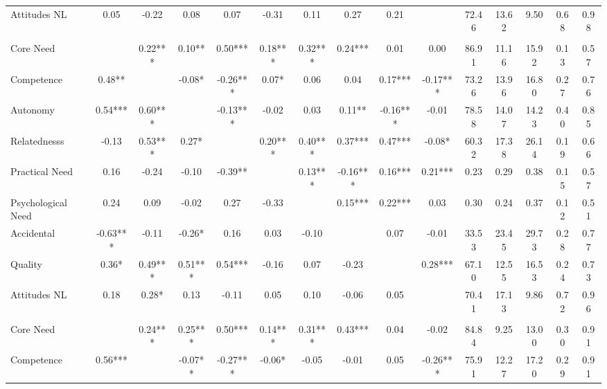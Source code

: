 \begin{table}
\begin{minipage}[t][\textheight][t]{\textwidth}
{\begin{tabular}[t]{lcccccccccccccc}
\hspace{1em}Attitudes NL & 0.05 & -0.22 & 0.08 & 0.07 & -0.31 & 0.11 & 0.27 & 0.21 &  & 72.46 & 13.62 & 9.50 & 0.68 & 0.98\\
\addlinespace[0.3em]
\multicolumn{15}{l}{\textbf{Study 2}}\\
\hspace{1em}Core Need &  & 0.22*** & 0.10** & 0.50*** & 0.18*** & 0.32*** & 0.24*** & 0.01 & 0.00 & 86.91 & 11.16 & 15.92 & 0.13 & 0.57\\
\hspace{1em}Competence & 0.48** &  & -0.08* & -0.26*** & 0.07* & 0.06 & 0.04 & 0.17*** & -0.17*** & 73.26 & 13.96 & 16.80 & 0.27 & 0.76\\
\hspace{1em}Autonomy & 0.54*** & 0.60*** &  & -0.13*** & -0.02 & 0.03 & 0.11** & -0.16*** & -0.01 & 78.58 & 14.07 & 14.23 & 0.40 & 0.85\\
\hspace{1em}Relatednesss & -0.13 & 0.53*** & 0.27* &  & 0.20*** & 0.40*** & 0.37*** & 0.47*** & -0.08* & 60.32 & 17.38 & 26.14 & 0.19 & 0.66\\
\hspace{1em}Practical Need & 0.16 & -0.24 & -0.10 & -0.39** &  & 0.13*** & -0.16*** & 0.16*** & 0.21*** & 0.23 & 0.29 & 0.38 & 0.15 & 0.57\\
\hspace{1em}Psychological Need & 0.24 & 0.09 & -0.02 & 0.27 & -0.33 &  & 0.15*** & 0.22*** & 0.03 & 0.30 & 0.24 & 0.37 & 0.12 & 0.51\\
\hspace{1em}Accidental & -0.63*** & -0.11 & -0.26* & 0.16 & 0.03 & -0.10 &  & 0.07 & -0.01 & 33.53 & 23.45 & 29.73 & 0.28 & 0.77\\
\hspace{1em}Quality & 0.36* & 0.49*** & 0.51*** & 0.54*** & -0.16 & 0.07 & -0.23 &  & 0.28*** & 67.10 & 12.55 & 16.53 & 0.24 & 0.73\\
\hspace{1em}Attitudes NL & 0.18 & 0.28* & 0.13 & -0.11 & 0.05 & 0.10 & -0.06 & 0.05 &  & 70.41 & 17.13 & 9.86 & 0.72 & 0.96\\
\addlinespace[0.3em]
\multicolumn{15}{l}{\textbf{Study 3}}\\
\hspace{1em}Core Need &  & 0.24*** & 0.25*** & 0.50*** & 0.14*** & 0.31*** & 0.43*** & 0.04 & -0.02 & 84.84 & 9.25 & 13.00 & 0.30 & 0.91\\
\hspace{1em}Competence & 0.56*** &  & -0.07** & -0.27*** & -0.06* & -0.05 & -0.01 & 0.05 & -0.26*** & 75.91 & 12.27 & 17.20 & 0.29 & 0.91\\

\end{tabular}}
\end{minipage}
\end{table}
